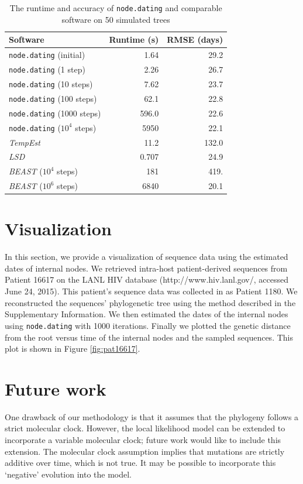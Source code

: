 \documentclass{bioinfo}
\newcommand{\code}[1]{{\tt #1}}
\begin{document}
\begin{table}[t]
	\caption[Runtime and accuracy]{The runtime and accuracy of \code{node.dating} and comparable software on 50 simulated trees}
	\label{tab:runtime}
	\centering
	\begin{tabular}{lrr}
		\hline
		Software & Runtime (s) & RMSE (days) \\
		\hline
		\code{node.dating} (initial) & 1.64 & 29.2 \\
		\code{node.dating} (1 step) & 2.26 & 26.7 \\
		\code{node.dating} (10 steps) & 7.62 & 23.7 \\
		\code{node.dating} (100 steps) & 62.1 & 22.8 \\
		\code{node.dating} (1000 steps) & 596.0 & 22.6 \\
		\code{node.dating} ($10^4$ steps) & 5950 & 22.1 \\
		\emph{TempEst} & 11.2 & 132.0 \\
		\emph{LSD} & 0.707 & 24.9 \\
		\emph{BEAST} ($10^4$ steps) & 181 & 419. \\
		\emph{BEAST} ($10^6$ steps) & 6840 & 20.1 \\
		\hline
	\end{tabular}
\end{table}

\section{Visualization} \label{sec:vis}
In this section, we provide a visualization of sequence data using the estimated dates of internal nodes.
We retrieved intra-host patient-derived sequences from Patient 16617 on the LANL HIV database (http://www.hiv.lanl.gov/, accessed June 24, 2015).
This patient's sequence data was collected in \cite{Llewellyn06} as Patient 1180.
We reconstructed the sequences' phylogenetic tree using the method described in the Supplementary Information.
We then estimated the dates of the internal nodes using \code{node.dating} with 1000 iterations. 
Finally we plotted the genetic distance from the root versus time of the internal nodes and the sampled sequences. 
This plot is shown in Figure \ref{fig:pat16617}.

\section{Future work} \label{sec:discuss}
One drawback of our methodology is that it assumes that the phylogeny follows a strict molecular clock.
However, the local likelihood model can be extended to incorporate a variable molecular clock; future work would like to include this extension.
The molecular clock assumption implies that mutations are strictly additive over time, which is not true.
It may be possible to incorporate this `negative' evolution into the model.
\end{document}
